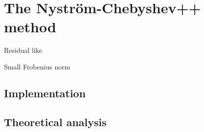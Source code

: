 \chapter{The Nystr\"om-Chebyshev++ method}
\label{chp:4-nystromchebyshev}


Residual like \cite{meyer2021hutch}

Small Frobenius norm


\section{Implementation}
\label{sec:4-nystromchebyshev-implementation}



\section{Theoretical analysis}
\label{sec:4-nystromchebyshev-analysis}
